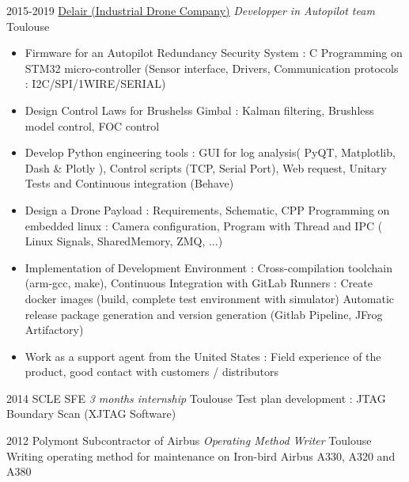 \documentclass[a4paper]{friggeri-cv} %
\begin{document}
\begin{entrylist}
\entry
{2015-2019}
{\href{https://delair.aero}{Delair (Industrial Drone Company)} \textit{ Developper in Autopilot team}}
{Toulouse}
{
\begin{itemize}
\item Firmware for an Autopilot Redundancy Security System : C Programming on
	STM32 micro-controller (Sensor interface, Drivers, Communication protocols : I2C/SPI/1WIRE/SERIAL)
\item Design Control Laws for Brushelss Gimbal : Kalman filtering, Brushless model control, FOC control
\item Develop Python engineering tools : GUI for log analysis( PyQT, Matplotlib, Dash \& Plotly ), Control scripts (TCP, Serial Port), Web request, Unitary Tests and Continuous integration (Behave)
\item Design a Drone Payload : Requirements, Schematic, CPP Programming on embedded linux : Camera configuration, Program with Thread and IPC (  Linux Signals, SharedMemory, ZMQ, ...)
\item Implementation of Development Environment : Cross-compilation toolchain (arm-gcc, make), Continuous Integration with GitLab Runners : Create docker images (build, complete test environment with simulator) Automatic release package generation and version generation (Gitlab Pipeline, JFrog Artifactory)
\item Work as a support agent from the United States : Field experience of the
	product, good contact with customers / distributors
\end{itemize}
%
}
\entry
{2014}
{SCLE SFE \textit{3 months internship}}
{Toulouse}
{Test plan development : JTAG Boundary Scan (XJTAG Software)
}

\entry
{2012}
{Polymont Subcontractor of Airbus \textit{Operating Method Writer}}
{Toulouse}
{ Writing operating method for maintenance on Iron-bird Airbus A330, A320 and A380 }


\end{entrylist}

\end{document}
